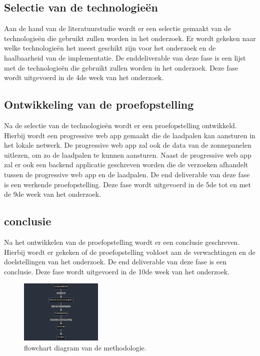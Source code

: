 \subsection{Selectie van de technologieën}%
\label{sub:selectie_van_de_technologieen}
Aan de hand van de literatuurstudie wordt er een selectie gemaakt van de technologieën die gebruikt zullen worden in het onderzoek. Er wordt gekeken naar welke technologieën het meest geschikt zijn voor het onderzoek en de haalbaarheid van de implementatie. De enddeliverable van deze fase is een lijst met de technologieën die gebruikt zullen worden in het onderzoek. Deze fase wordt uitgevoerd in de 4de week van het onderzoek.

\subsection{Ontwikkeling van de proefopstelling}%
\label{sub:ontwikkeling_van_de_proefopstelling}
Na de selectie van de technologieën wordt er een proefopstelling ontwikkeld. Hierbij wordt een progressive web app gemaakt die de laadpalen kan aansturen in het lokale netwerk. De progressive web app zal ook de data van de zonnepanelen uitlezen, om zo de laadpalen te kunnen aansturen. Naast de progressive web app zal er ook een backend applicatie geschreven worden die de verzoeken afhandelt tussen de progressive web app en de laadpalen. De end deliverable van deze fase is een werkende proefopstelling. Deze fase wordt uitgevoerd in de 5de tot en met de 9de week van het onderzoek.

\subsection{conclusie}%
\label{sub:conclusie_methodologie}
Na het ontwikkelen van de proefopstelling wordt er een conclusie geschreven. Hierbij wordt er gekeken of de proefopstelling voldoet aan de verwachtingen en de doelstellingen van het onderzoek. De end deliverable van deze fase is een conclusie. Deze fase wordt uitgevoerd in de 10de week van het onderzoek.


\begin{figure}[b]
  \centering
  \includegraphics[width=0.35\textwidth,height=0.35\textheight,keepaspectratio]{./graphics/mermaid-diagram.png}
  \caption{flowchart diagram van de methodologie.}
  \label{fig:flowchart}
\end{figure}

